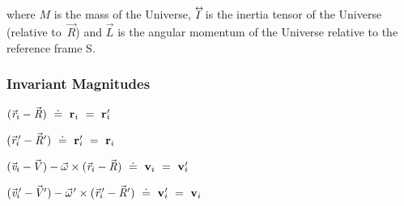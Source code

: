 \documentclass[10pt]{article}
\begin{document}
\par \bigskip \noindent where ${\mathit{M}}$ is the mass of the Universe, ${\mathit{I}}{\vphantom{\sum_1^2}}^{\hspace{-0.555em}\leftrightarrow}\hspace{-0.300em}$ is the inertia tensor of the Universe (relative \hbox {to ${\vec{\mathit{R}}}$)} and ${\vec{\mathit{L}}}$ is the angular momentum of the Universe relative to the reference frame S.

\vspace{+1.50em}

\par {\centering\subsubsection*{Invariant Magnitudes}}\hypertarget{a1p2}{}

\par \bigskip\medskip \hspace{-1.80em} $({\vec{\mathit{r}}}_i - {\vec{\mathit{R}}}) ~\doteq~ {\mathbf{r}}_i ~=~ {\mathbf{r}}_i\hspace{-0.300em}'$

\par \bigskip \hspace{-1.80em} $({\vec{\mathit{r}}}_i\hspace{-0.150em}' - {\vec{\mathit{R}}}\hspace{+0.015em}') ~\doteq~ {\mathbf{r}}_i\hspace{-0.300em}' ~=~ {\mathbf{r}}_i$

\par \bigskip \hspace{-1.80em} $({\vec{\mathit{v}}}_i - \hspace{-0.120em}{\vec{\mathit{V}}}) - {\vec{\omega}} \times ({\vec{\mathit{r}}}_i - {\vec{\mathit{R}}}) ~\doteq~ {\mathbf{v}}_i ~=~ {\mathbf{v}}_i\hspace{-0.300em}'$

\par \bigskip \hspace{-1.80em} $({\vec{\mathit{v}}}_i\hspace{-0.150em}' - \hspace{-0.120em}{\vec{\mathit{V}}}\hspace{-0.045em}') - {\vec{\omega}}\hspace{+0.060em}' \times ({\vec{\mathit{r}}}_i\hspace{-0.150em}' - {\vec{\mathit{R}}}\hspace{+0.015em}') ~\doteq~ {\mathbf{v}}_i\hspace{-0.300em}' ~=~ {\mathbf{v}}_i$
\end{document}

